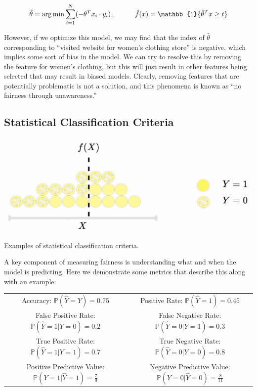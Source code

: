 $$\hat{\theta} = \argmin \sum_{i=1}^{N} (-\theta^Tx_i \cdot y_i)_+ \hspace{1cm} \hat{f}(x) = \mathbb{1} \{\hat{\theta}^Tx \ge t\}$$

However, if we optimize this model, we may find that the index of $\hat{\theta}$ corresponding to ``visited website for women's clothing store'' is negative, which implies some sort of bias in the model. We can try to resolve this by removing the feature for women's clothing, but this will just result in other features being selected that may result in biased models. Clearly, removing features that are potentially problematic is not a solution, and this phenomena is known as ``no fairness through unawareness.'' 

\subsection{Statistical Classification Criteria}
\begin{marginfigure}
\centering
\includegraphics[width=\linewidth]{graphics/example.png}
\caption{Examples of statistical classification criteria.}
\end{marginfigure}
A key component of measuring fairness is understanding what and when the model is predicting. 
Here we demonstrate some metrics that describe this along with an example:
\begin{center}
\begin{tabular}{ ||c | c|| }
 \hline
 Accuracy: $\mathbb{P}(\hat{Y} = Y) = 0.75$  & Positive Rate: $\mathbb{P}(\hat{Y} = 1)= 0.45$ \\ 
 False Positive Rate: $\mathbb{P}(\hat{Y} = 1 | Y = 0)=0.2$ & False Negative Rate: $\mathbb{P}(\hat{Y} = 0 | Y = 1)=0.3$ \\  
 True Positive Rate: $\mathbb{P}(\hat{Y} = 1 | Y = 1)=0.7$ & True Negative Rate: $\mathbb{P}(\hat{Y} = 0 | Y = 0)=0.8$\\
 Positive Predictive Value: $\mathbb{P}(Y = 1 | \hat{Y} = 1)=\frac{7}{9}$ & Negative Predictive Value: $\mathbb{P}(Y = 0 | \hat{Y} = 0)=\frac{8}{11}$\\
 \hline
\end{tabular}
\end{center}

